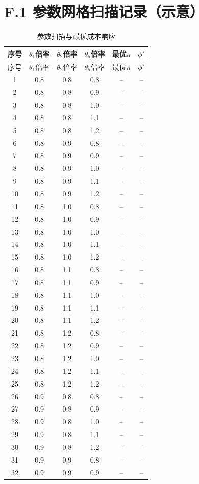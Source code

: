 \section*{F.1 参数网格扫描记录（示意）}
\small
\begin{longtable}{cccccc}
\caption{参数扫描与最优成本响应}\\
\toprule
序号 & $\theta_1$倍率 & $\theta_2$倍率 & $\theta_5$倍率 & 最优$n$ & $\phi^\star$\\
\midrule
\endfirsthead
\toprule
序号 & $\theta_1$倍率 & $\theta_2$倍率 & $\theta_5$倍率 & 最优$n$ & $\phi^\star$\\
\midrule
\endhead
1&0.8&0.8&0.8&--&--\\
2&0.8&0.8&0.9&--&--\\
3&0.8&0.8&1.0&--&--\\
4&0.8&0.8&1.1&--&--\\
5&0.8&0.8&1.2&--&--\\
6&0.8&0.9&0.8&--&--\\
7&0.8&0.9&0.9&--&--\\
8&0.8&0.9&1.0&--&--\\
9&0.8&0.9&1.1&--&--\\
10&0.8&0.9&1.2&--&--\\
11&0.8&1.0&0.8&--&--\\
12&0.8&1.0&0.9&--&--\\
13&0.8&1.0&1.0&--&--\\
14&0.8&1.0&1.1&--&--\\
15&0.8&1.0&1.2&--&--\\
16&0.8&1.1&0.8&--&--\\
17&0.8&1.1&0.9&--&--\\
18&0.8&1.1&1.0&--&--\\
19&0.8&1.1&1.1&--&--\\
20&0.8&1.1&1.2&--&--\\
21&0.8&1.2&0.8&--&--\\
22&0.8&1.2&0.9&--&--\\
23&0.8&1.2&1.0&--&--\\
24&0.8&1.2&1.1&--&--\\
25&0.8&1.2&1.2&--&--\\
26&0.9&0.8&0.8&--&--\\
27&0.9&0.8&0.9&--&--\\
28&0.9&0.8&1.0&--&--\\
29&0.9&0.8&1.1&--&--\\
30&0.9&0.8&1.2&--&--\\
31&0.9&0.9&0.8&--&--\\
32&0.9&0.9&0.9&--&--\\

\end{longtable}
